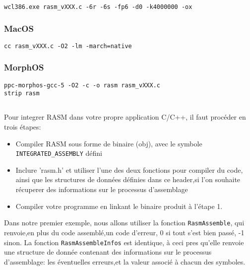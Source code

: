 \begin{verbatim}
wcl386.exe rasm_vXXX.c -6r -6s -fp6 -d0 -k4000000 -ox
\end{verbatim}

\subsubsection{MacOS}

\begin{verbatim}
cc rasm_vXXX.c -O2 -lm -march=native
\end{verbatim}

\subsubsection{MorphOS}

\begin{verbatim}
ppc-morphos-gcc-5 -O2 -c -o rasm rasm_vXXX.c
strip rasm
\end{verbatim}


\subsection{}

\begin{xfr}
Pour integrer RASM dans votre propre application C/C++, il faut procéder en trois étapes:

\begin{itemize}
\item Compiler RASM sous forme de binaire (obj), avec le symbole \texttt{INTEGRATED\_ASSEMBLY} défini
\item Inclure 'rasm.h' et utiliser l'une des deux fonctions pour compiler du code, ainsi que les structures de données définies dans ce header,si l'on souhaite récuperer des informations sur le processus d'assemblage
\item Compiler votre programme en linkant le binaire produit à l'étape 1.
\end{itemize}

Dans notre premier exemple, nous allons utiliser la fonction \texttt{RasmAssemble}, qui renvoie,en plus du code assemblé,un code d'erreur, 0 si tout s'est bien passé, -1 sinon. La fonction \texttt{RasmAssembleInfos} est identique, à ceci pres qu'elle renvoie une structure de donnée contenant des informations sur le processus d'assemblage: les éventuelles erreurs,et la valeur associé à chacun des symboles.
\end{xfr}

